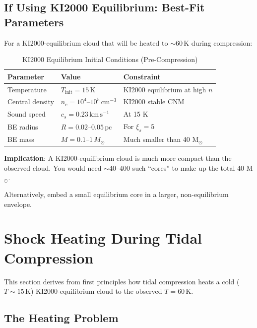\documentclass[11pt,a4paper]{article}
\newcommand{\Msun}{M_\odot}
\newcommand{\kms}{\,\mathrm{km\,s^{-1}}}
\newcommand{\pc}{\,\mathrm{pc}}
\newcommand{\cmcubed}{\,\mathrm{cm^{-3}}}
\begin{document}
\subsection{If Using KI2000 Equilibrium: Best-Fit Parameters}

For a KI2000-equilibrium cloud that will be heated to $\sim 60\,\mathrm{K}$ during compression:

\begin{table}[h]
\centering
\caption{KI2000 Equilibrium Initial Conditions (Pre-Compression)}
\begin{tabular}{lll}
\toprule
\textbf{Parameter} & \textbf{Value} & \textbf{Constraint} \\
\midrule
Temperature & $T_\mathrm{init} = 15\,\mathrm{K}$ & KI2000 equilibrium at high $n$ \\
Central density & $n_c = 10^4$--$10^5\cmcubed$ & KI2000 stable CNM \\
Sound speed & $c_s = 0.23\kms$ & At 15 K \\
BE radius & $R = 0.02$--$0.05\pc$ & For $\xi_s = 5$ \\
BE mass & $M = 0.1$--$1\,\Msun$ & Much smaller than 40 M$_\odot$ \\
\bottomrule
\end{tabular}
\end{table}

\textbf{Implication}: A KI2000-equilibrium cloud is much more compact than the observed cloud.
You would need $\sim 40$--$400$ such ``cores'' to make up the total 40 M$_\odot$.

Alternatively, embed a small equilibrium core in a larger, non-equilibrium envelope.

\section{Shock Heating During Tidal Compression}
\label{sec:shock_heating}

This section derives from first principles how tidal compression heats a
cold ($T \sim 15\,\mathrm{K}$) KI2000-equilibrium cloud to the observed
$T = 60\,\mathrm{K}$.

\subsection{The Heating Problem}
\end{document}
